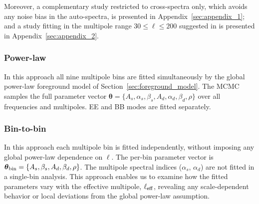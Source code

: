 Moreover, a complementary study restricted to cross-spectra only, which avoids any noise bias in the auto-spectra, is presented in Appendix~\ref{sec:appendix_1}; and a study fitting in the multipole range $30 \leq \ell \leq 200$ suggested in \cite{QUIJOTE_IV} is presented in Appendix~\ref{sec:appendix_2}.

\subsubsection{Power-law}
\label{sec:fitting_methods_pl}

In this approach all nine multipole bins are fitted simultaneously by the global power-law foreground model of Section~\ref{sec:foreground_model}. The MCMC samples the full parameter vector $\boldsymbol{\theta} = \{A_s, \alpha_s, \beta_s, A_d, \alpha_d, \beta_d, \rho\}$ over all frequencies and multipoles. EE and BB modes are fitted separately.

\subsubsection{Bin-to-bin}
\label{sec:fitting_methods_btb}

In this approach each multipole bin is fitted independently, without imposing any global power-law dependence on $\ell$. The per-bin parameter vector is $\boldsymbol{\theta}_{\rm bin} = \{A_s, \beta_s, A_d, \beta_d, \rho\}$. The multipole spectral indices ($\alpha_s$, $\alpha_d$) are not fitted in a single-bin analysis. This approach enables us to examine how the fitted parameters vary with the effective multipole, $\ell_{\rm eff}$, revealing any scale-dependent behavior or local deviations from the global power-law assumption.
